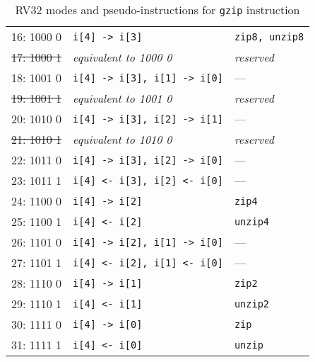 \begin{table}[h]
\begin{small}
\begin{center}
\begin{tabular}{r l l}
\hline

      16: 1000 0  & {\tt i[4] -> i[3]}               & {\tt zip8, unzip8}     \\
\sout{17: 1000 1} & {\it equivalent to 1000 0}       & {\it reserved}         \\
      18: 1001 0  & {\tt i[4] -> i[3], i[1] -> i[0]} & ---                    \\
\sout{19: 1001 1} & {\it equivalent to 1001 0}       & {\it reserved}         \\
      20: 1010 0  & {\tt i[4] -> i[3], i[2] -> i[1]} & ---                    \\
\sout{21: 1010 1} & {\it equivalent to 1010 0}       & {\it reserved}         \\
      22: 1011 0  & {\tt i[4] -> i[3], i[2] -> i[0]} & ---                    \\
      23: 1011 1  & {\tt i[4] <- i[3], i[2] <- i[0]} & ---                    \\

\hline

      24: 1100 0  & {\tt i[4] -> i[2]}               & {\tt zip4}             \\
      25: 1100 1  & {\tt i[4] <- i[2]}               & {\tt unzip4}           \\
      26: 1101 0  & {\tt i[4] -> i[2], i[1] -> i[0]} & ---                    \\
      27: 1101 1  & {\tt i[4] <- i[2], i[1] <- i[0]} & ---                    \\
      28: 1110 0  & {\tt i[4] -> i[1]}               & {\tt zip2}             \\
      29: 1110 1  & {\tt i[4] <- i[1]}               & {\tt unzip2}           \\
      30: 1111 0  & {\tt i[4] -> i[0]}               & {\tt zip}              \\
      31: 1111 1  & {\tt i[4] <- i[0]}               & {\tt unzip}            \\
\end{tabular}
\end{center}
\end{small}
\caption{RV32 modes and pseudo-instructions for {\tt gzip} instruction}
\label{gzip32-modes}
\end{table}

